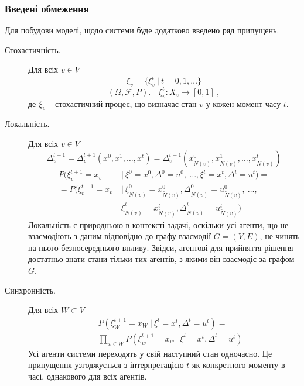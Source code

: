 \documentclass[oneside,14pt]{extarticle}
\begin{document}
\subsubsection{Введені обмеження}

Для побудови моделі, щодо системи буде додатково введено ряд припущень.

\begin{description}

    \item[Стохастичність.] Для всіх \(v \in V\)
    \[ \xi_v = \{\xi^t_v\ |\ t = 0, 1, \ldots \}\] 
    \[ (\Omega, \mathcal{F}, P).\quad \xi_v^t : X_v \rightarrow [0, 1]\ ,\]
    де \( \xi_v \) – стохастичний процес, що визначає стан \(v\) у кожен момент часу \(t\). 
    \label{stochasticprocess}
    
    \item[Локальність.] Для всіх \(v \in V\) 
    \[\Delta_v^{t+1} = \Delta_v^{t+1}(x^0, x^1, \ldots, x^t) = \Delta_v^{t+1}(x_{\tilde{N}(v)}^0, x_{\tilde{N}(v)}^1, \ldots, x_{\tilde{N}(v)}^t)\]
    \begin{align*}
    P(\xi_v^{t+1} = x_v\ &|\ \xi^0 = x^0, \Delta^0 = u^0,\ \ldots, \xi^t = x^t, \Delta^t = u^t) = \\
	= P(\xi_v^{t+1} = x_v\ &|\ \xi_{\tilde N(v)}^0 = x_{\tilde N(v)}^0, \Delta_{\tilde N(v)}^0 = u_{\tilde N(v)}^0,\ \ldots,\\ &\xi_{\tilde N(v)}^t = x_{\tilde N(v)}^t, \Delta_{\tilde N(v)}^t = u_{\tilde N(v)}^t)
	\end{align*}
	Локальність є природньою в контексті задачі, оскільки усі агенти, що не взаємодіють з даним відповідно до графу взаємодії \(G = (V, E)\), не чинять на нього безпосереднього впливу. Звідси, агентові для прийняття рішення достатньо знати стани тільки тих агентів, з якими він взаємодіє за графом \(G\).
	
    \item[Синхронність.] Для всіх \(W \subset V\)
    \begin{align*}
    &P(\xi^{t+1}_W = x_W\ |\ \xi^t = x^t, \Delta^t = u^t) = \\
    = &\prod_{w \in W} P(\xi^{t+1}_w = x_w\ |\ \xi^t = x^t, \Delta^t = u^t)
    \end{align*}
    Усі агенти системи переходять у свій наступний стан одночасно. Це припущення узгоджується з інтерпретацією \(t\) як конкретного моменту в часі, однакового для всіх агентів.


\end{description}
\end{document}
